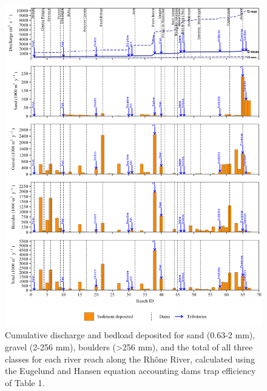 \documentclass[
]{book}
\begin{document}
\begin{figure}
\includegraphics[width=26.24in]{img/res_cascade/res_E2_eE&H/plots_dep-silt/dep_res_sum_hy_E2_eE&H} \caption{Cumulative discharge and bedload deposited for sand (0.63-2 mm), gravel (2-256 mm), boulders (>256 mm), and the total of all three classes for each river reach along the Rhône River, calculated using the Eugelund and Hansen equation accounting dams trap efficiency of Table 1.}\label{fig:DepE2eE}
\end{figure}
\end{document}
